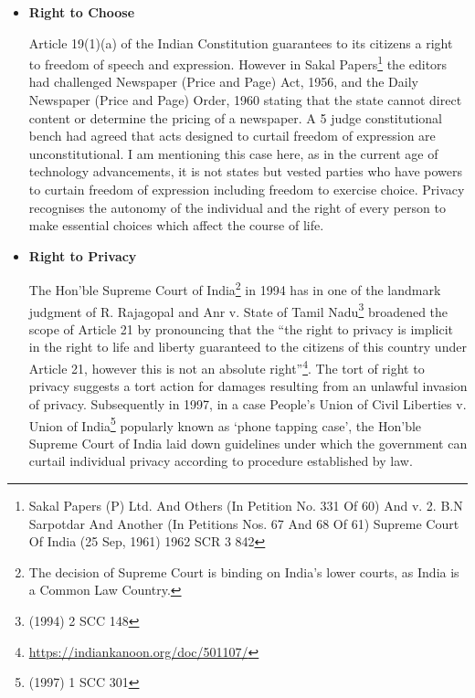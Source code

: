 \begin{multicols}{2}
\begin{itemize}

\item[{\bf 1)}] \textbf{Right to Choose}

Article 19(1)(a) of the Indian Constitution guarantees to its citizens a right to freedom of speech and expression. However in Sakal Papers\footnote{Sakal Papers (P) Ltd. And Others (In Petition No. 331 Of 60) And v. 2. B.N Sarpotdar And Another (In Petitions Nos. 67 And 68 Of 61) Supreme Court Of India (25 Sep, 1961) 1962 SCR 3 842}  the editors had challenged Newspaper (Price and Page) Act, 1956, and the Daily Newspaper (Price and Page) Order, 1960 stating that the state cannot direct content or determine the pricing of a newspaper. A 5 judge constitutional bench had agreed that acts designed to curtail freedom of expression are unconstitutional. I am mentioning this case here, as in the current age of technology advancements, it is not states but vested parties who have powers to curtain freedom of expression including freedom to exercise choice. Privacy recognises the autonomy of the individual and the right of every person to make essential choices which affect the course of life.

\item[{\bf 2)}] \textbf{Right to Privacy}

The Hon’ble Supreme Court of India\footnote{The decision of Supreme Court is binding on India’s lower courts, as India is a Common Law Country.} in 1994 has in one of the landmark judgment of R. Rajagopal and Anr v. State of Tamil Nadu\footnote{ (1994) 2 SCC 148} broadened the scope of Article 21 by pronouncing that the “the right to privacy is implicit in the right to life and liberty guaranteed to the citizens of this country under Article 21, however this is not an absolute right”\footnote{\url{https://indiankanoon.org/doc/501107/}}. The tort of right to privacy suggests a tort action for damages resulting from an unlawful invasion of privacy. Subsequently in 1997, in a case People’s Union of Civil Liberties v. Union of India\footnote{(1997) 1 SCC 301} popularly known as ‘phone tapping case’, the Hon’ble Supreme Court of India laid down guidelines under which the government can curtail individual privacy according to procedure established by law. 


\end{itemize}
\end{multicols}
